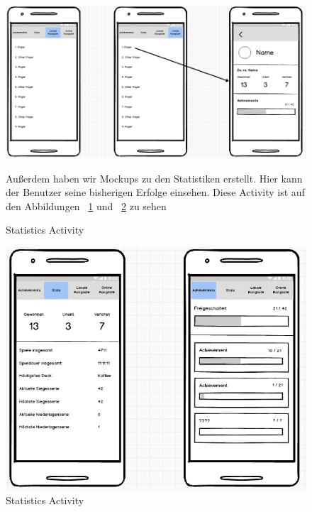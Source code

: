 \documentclass{scrartcl}
\begin{document}
\begin{figure}[!ht]
\begin{center}
	\includegraphics[scale=0.58]{img/mockup_stats_1.png}
	\caption{Statistics Activity}
	\label{stats1}
\end{center}
Außerdem haben wir Mockups zu den Statistiken erstellt. Hier kann der Benutzer
seine bisherigen Erfolge einsehen. Diese Activity ist auf den Abbildungen
~\ref{stats1} und ~\ref{stats2} zu sehen
\end{figure}

\begin{figure}[!ht]
\begin{center}
\centering
	\includegraphics[scale=0.75]{img/mockup_stats_2.png}
	\caption{Statistics Activity}
	\label{stats2}
\end{center}
\end{figure}

\clearpage
\end{document}
